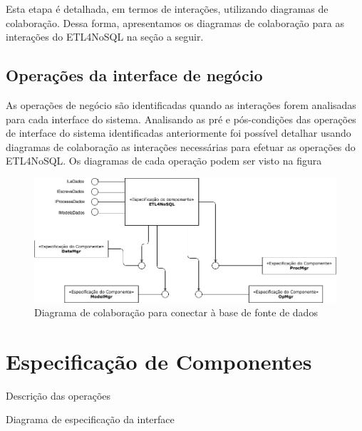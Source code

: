 Esta etapa é detalhada, em termos de interações, utilizando diagramas de colaboração. Dessa forma, apresentamos os diagramas de colaboração para as interações do ETL4NoSQL na seção a seguir.

\subsection{Operações da interface de negócio}

As operações de negócio são identificadas quando as interações forem analisadas para cada interface do sistema. Analisando as pré e pós-condições das operações de interface do sistema identificadas anteriormente foi possível detalhar usando diagramas de colaboração as interações necessárias para efetuar as operações do ETL4NoSQL. Os diagramas de cada operação podem ser visto na figura 

\begin{figure}[h]
	\centering
	\includegraphics[scale=0.5]{fig/arquitetura_comp.png}
	\caption{Diagrama de colaboração para conectar à base de fonte de dados}
	\label{op_interface}
\end{figure}

\section{Especificação de Componentes}

Descrição das operações

Diagrama de especificação da interface





